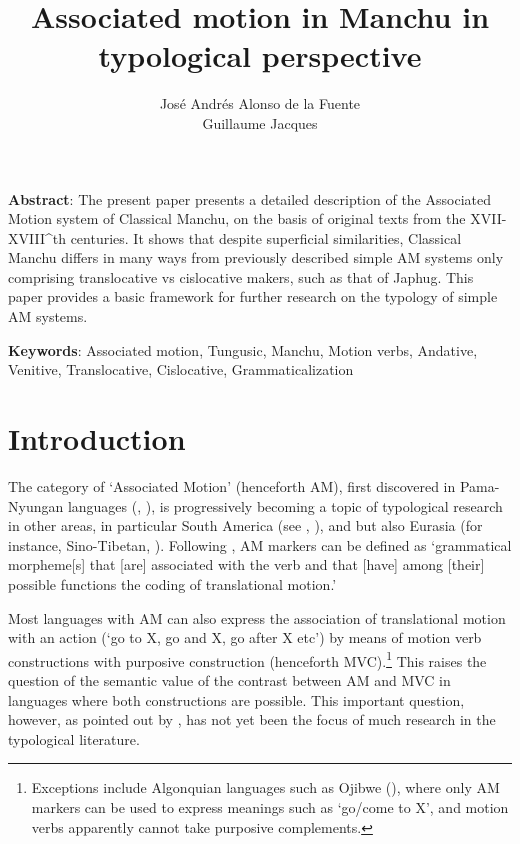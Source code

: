 \documentclass{article}
\begin{document}
 
\title{Associated motion in Manchu in typological perspective }
\author{José Andrés Alonso de la Fuente \\ Guillaume Jacques}
\maketitle 

\textbf{Abstract}: The present paper presents a detailed description of the Associated Motion system of Classical Manchu, on the basis of original texts from the XVII-XVIII^{th} centuries. It shows that despite superficial similarities, Classical Manchu differs in many ways from previously described simple AM systems only comprising translocative vs cislocative makers, such as that of Japhug. This paper provides a basic framework for further research on the typology of simple AM systems.

\textbf{Keywords}: Associated motion, Tungusic, Manchu, Motion verbs, Andative, Venitive, Translocative, Cislocative, Grammaticalization

\section*{Introduction}
The category of `Associated Motion' (henceforth AM), first discovered in Pama-Nyungan languages (\citealt{koch84associated.motion}, \citealt{wilkins91associated.motion}), is progressively becoming a topic of typological research in other areas, in particular South America (see \citealt{guillaume08cavinena}, \citealt{guillaume16am}), and but also Eurasia (for instance, Sino-Tibetan, \citealt{jacques13harmonization}). Following \citet[12]{guillaume16am}, AM markers can be defined as `grammatical morpheme[s] that [are] associated with the verb
and that [have] among [their] possible functions the coding of translational
motion.'

Most languages with AM can also express the association of translational motion with an action (`go to X, go and X, go after X etc')  by means of motion verb constructions with purposive construction (henceforth MVC).\footnote{Exceptions include Algonquian languages such as Ojibwe (\citealt[729-733]{valentine01grammar}), where only AM markers can be used to express meanings such as `go/come to X', and motion verbs apparently cannot take purposive complements.} This raises the question of the semantic value of the contrast between AM and MVC in languages where both constructions are possible. This important question, however, as pointed out by \citet[10]{guillaume16am}, has not yet been the focus of much research in the typological literature.
\end{document}
